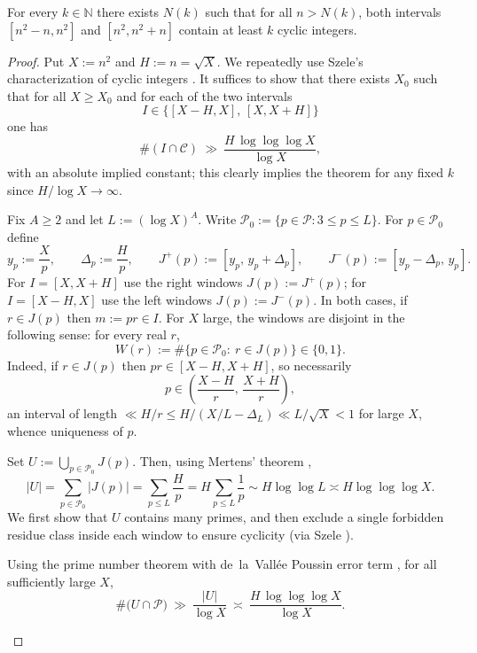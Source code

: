 \begin{theorem}\label{thm:k_fold_oppermann_for_cyclics}
For every $k\in \mathbb{N}$ there exists $N(k)$ such that for all $n>N(k)$, both intervals $[n^2-n,n^2]$ and $[n^2,n^2+n]$ contain at least $k$ cyclic integers.
\end{theorem}

\begin{proof}
Put $X:=n^2$ and $H:=n=\sqrt X$. We repeatedly use Szele's characterization of cyclic integers \cite{Szele1947}. It suffices to show that there exists $X_0$ such that for all $X\ge X_0$ and for each of the two intervals
$$
I\in\{[X-H,X],\,[X,X+H]\}
$$
one has
$$
\#(I\cap\mathcal C)\ \gg\ \frac{H\,\log\log\log X}{\log X},
$$
with an absolute implied constant; this clearly implies the theorem for any fixed $k$ since $H/\log X\to\infty$.

Fix $A\ge2$ and let $L:=(\log X)^A$. Write $\mathcal P_0:=\{p\in\mathcal P:3\le p\le L\}$. For $p\in\mathcal P_0$ define
$$
 y_p:=\frac{X}{p},\qquad \Delta_p:=\frac{H}{p},\qquad J^+(p):=[y_p,\,y_p+\Delta_p],\qquad J^-(p):=[y_p-\Delta_p,\,y_p].
$$
For $I=[X,X+H]$ use the right windows $J(p):=J^+(p)$; for $I=[X-H,X]$ use the left windows $J(p):=J^-(p)$. In both cases, if $r\in J(p)$ then $m:=pr\in I$. For $X$ large, the windows are disjoint in the following sense: for every real $r$,
$$
W(r):=\#\{p\in\mathcal P_0:\ r\in J(p)\}\in\{0,1\}.
$$
Indeed, if $r\in J(p)$ then $pr\in[X-H,X+H]$, so necessarily
$$
p\in\left(\frac{X-H}{r},\,\frac{X+H}{r}\right),
$$
an interval of length $\ll H/r\le H/(X/L-\Delta_L)\ll L/\sqrt X<1$ for large $X$, whence uniqueness of $p$.

Set $U:=\bigcup_{p\in\mathcal P_0} J(p)$. Then, using Mertens' theorem \cite{Apostol1976,MV2007},
$$
|U|=\sum_{p\in\mathcal P_0}|J(p)|=\sum_{p\le L}\frac{H}{p}
 = H\sum_{p\le L}\frac1p\sim H\log\log L\asymp H\log\log\log X.\tag{1}
$$
We first show that $U$ contains many primes, and then exclude a single forbidden residue class inside each window to ensure cyclicity (via Szele \cite{Szele1947}).

\begin{lemma}\label{lem:many-primes-U}
Using the prime number theorem with de~la~Vall\'ee Poussin error term \cite{MV2007,IK2004}, for all sufficiently large $X$,
$$
\#\bigl(U\cap\mathcal P\bigr)\ \gg\ \frac{|U|}{\log X}\ \asymp\ \frac{H\,\log\log\log X}{\log X}.\tag{2}
$$
\end{lemma}


\end{proof}
